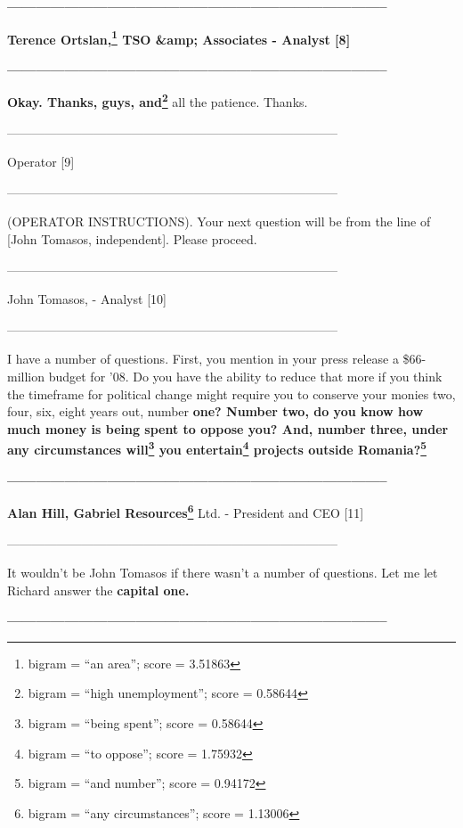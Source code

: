 \documentclass{article}
\begin{document}
 \textbf{--------------------------------------------------------------------------------} 

 \textbf{Terence Ortslan,\footnote{bigram = ``an area''; score = 3.51863} TSO \&amp; Associates - Analyst [8]} 

 \textbf{--------------------------------------------------------------------------------} 

 \textbf{Okay. Thanks, guys, and\footnote{bigram = ``high unemployment''; score = 0.58644}} all the patience. Thanks. 

 -------------------------------------------------------------------------------- 

 Operator [9] 

 -------------------------------------------------------------------------------- 

 (OPERATOR INSTRUCTIONS). Your next question will be from the line of [John Tomasos, independent]. Please proceed. 

 -------------------------------------------------------------------------------- 

 John Tomasos, - Analyst [10] 

 -------------------------------------------------------------------------------- 

 I have a number of questions. First, you mention in your press release a \$66-million budget for '08. Do you have the ability to reduce that more if you think the timeframe for political change might require you to conserve your monies two, four, six, eight years out, number \textbf{one? Number two, do you know how much money is being spent to oppose you? And, number three, under any circumstances will\footnote{bigram = ``being spent''; score = 0.58644} you entertain\footnote{bigram = ``to oppose''; score = 1.75932} projects outside Romania?\footnote{bigram = ``and number''; score = 0.94172}} 

 \textbf{--------------------------------------------------------------------------------} 

 \textbf{Alan Hill, Gabriel Resources\footnote{bigram = ``any circumstances''; score = 1.13006}} Ltd. - President and CEO [11] 

 -------------------------------------------------------------------------------- 

 It wouldn't be John Tomasos if there wasn't a number of questions. Let me let Richard answer the \textbf{capital one.} 

 \textbf{--------------------------------------------------------------------------------} 
\end{document}
